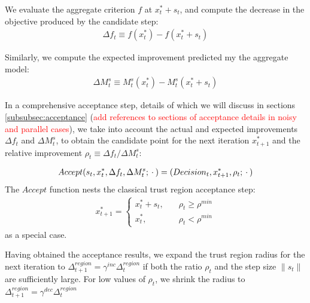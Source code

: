 We evaluate the aggregate criterion $f$ at $x^{*}_t+s_t$, and compute the decrease in the objective produced by the candidate step:
\begin{align}
    \Delta f_t\equiv f(x_t^*) - f(x_t^*+s_t)
    \label{eq:actual-improvement}
\end{align}

Similarly, we compute the expected improvement predicted my the aggregate model:
\begin{align}
    \Delta M^{s}_t\equiv M_t^s(x_t^*) - M_t^s(x_t^*+s_t)
    \label{eq:expected-improvement}
\end{align}

In a comprehensive acceptance step, details of which we will discuss in sections \ref{subsubsec:acceptance} (\textcolor{red}{add references to sections of acceptance details in noisy and parallel cases}), we take into account the actual and expected improvements $\Delta f_t$ and $\Delta M_t^s$, to obtain the candidate point for the next iteration $x_{t+1}^*$ and the relative improvement $\rho_t\equiv \Delta f_t/ \Delta M^s_t$:

\begin{align}
    Accept(s_t,x_t^{*},\Delta f_t,\Delta M_t^s;\hspace{0.2em}\cdot\hspace{0.2em})=(Decision_t,x_{t+1}^{*},\rho_t;\hspace{0.2em}\cdot\hspace{0.2em})
    \label{eq:acceptance-core}
\end{align}
The $Accept$ function nests the classical trust region acceptance step:
\begin{align}
    x_{t+1}^*=\begin{cases}
        x_t^*+s_t,\quad&\rho_t\geq\rho^{min}\\
        x_t^*,\quad&\rho_t<\rho^{min}
    \end{cases}
    \label{eq:accept-classic}
\end{align}
as a special case.

Having obtained the acceptance results, we expand the trust region radius for the next iteration to $\Delta_{t+1}^{region}=\gamma^{inc}\Delta_t^{region}$ if both the ratio $\rho_t$ and the step size $\lVert s_t\rVert$ are sufficiently large. For low values of $\rho_t$, we shrink the radius to $\Delta^{region}_{t+1} = \gamma^{dec}\Delta_t^{region}$
